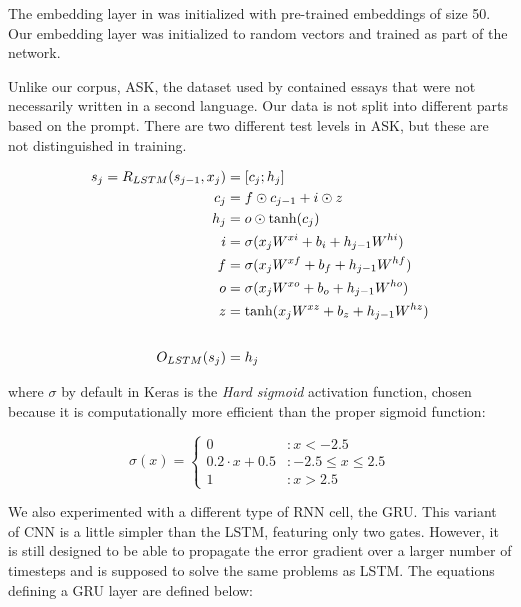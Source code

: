 The embedding layer in \textcite{taghipour16} was initialized with
pre-trained embeddings of size 50. Our embedding layer was initialized to
random vectors and trained as part of the network.

Unlike our corpus, ASK, the dataset used by \citeauthor{taghipour16}
contained essays that were not necessarily written in a second language. Our
data is not split into different parts based on the prompt. There are two
different test levels in ASK, but these are not distinguished in training.

\begin{equation}
  \begin{aligned}
  s_j = R_{LSTM}(s_{j-1}, x_j) &= [c_j;h_j] \\
                           c_j &= f \odot c_{j-1} + i \odot z \\
                           h_j &= o \odot \tanh(c_j) \\
                             i &= \sigma(x_j W^{xi} + b_i + h_{j-1} W^{hi}) \\
                             f &= \sigma(x_j W^{xf} + b_f + h_{j-1} W^{hf}) \\
                             o &= \sigma(x_j W^{xo} + b_o + h_{j-1} W^{ho}) \\
                             z &= \tanh(x_j W^{xz} + b_z + h_{j-1} W^{hz}) \\
                             \\[1\jot]
                 O_{LSTM}(s_j) &= h_j
  \end{aligned}
\end{equation}

where $\sigma$ by default in Keras is the \emph{Hard sigmoid} activation
function, chosen because it is computationally more efficient than the proper
sigmoid function:

\begin{equation}
  \sigma(x) = \begin{cases}
    0                 & : x < -2.5 \\
    0.2 \cdot x + 0.5 & : -2.5 \leq x \leq 2.5 \\
    1                 & : x > 2.5
  \end{cases}
\end{equation}

We also experimented with a different type of \ac{RNN} cell, the \ac{GRU}. This
variant of \ac{CNN} is a little simpler than the \ac{LSTM}, featuring only two
gates. However, it is still designed to be able to propagate the error gradient
over a larger number of timesteps and is supposed to solve the same problems
as \ac{LSTM}. The equations defining a \ac{GRU} layer are defined below:

